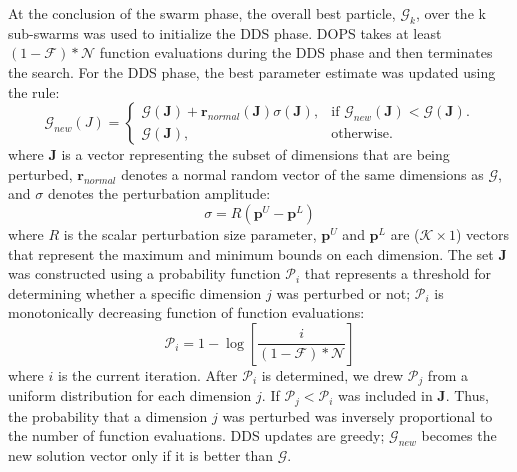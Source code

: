 \documentclass{bmcart}
\begin{document}
At the conclusion of the swarm phase, the overall best particle, $\mathcal{G}_{k}$, over the k sub-swarms was used to initialize the DDS phase.
DOPS takes at least $\left(1-\mathcal{F}\right)*\mathcal{N}$ function evaluations during the DDS phase and then terminates the search.
For the DDS phase, the best parameter estimate was updated using the rule:
\begin{equation}
  \mathcal{G}_{new}({J})=\begin{cases}
    \mathcal{G}(\mathbf{J})+\mathbf{r}_{normal}(\mathbf{J})\sigma(\mathbf{J}), & \text{if $\mathcal{G}_{new}(\mathbf{J})<\mathcal{G}(\mathbf{J})$}.\\
    \mathcal{G}(\mathbf{J}), & \text{otherwise}.
  \end{cases}
\end{equation}
where $\mathbf{J}$ is a vector representing the subset of dimensions that are being perturbed, $\mathbf{r}_{normal}$ denotes a normal random vector of the same dimensions as $\mathcal{G}$,
and $\sigma$ denotes the perturbation amplitude:
\begin{equation}
	\sigma = {R}(\mathbf{p}^U - \mathbf{p}^L)
\end{equation}
where ${R}$ is the scalar perturbation size parameter, $\mathbf{p}^U$ and $\mathbf{p}^L$ are ($\mathcal{K}\times{1}$) vectors that represent the maximum and minimum bounds on each dimension. The set $\mathbf{J}$ was constructed using a probability function $\mathcal{P}_{i}$ that represents a threshold for determining whether a specific dimension $j$ was perturbed or not; $\mathcal{P}_{i}$ is monotonically decreasing function of function evaluations:
\begin{equation}
	\mathcal{P}_{i}={1}-\log\left[\frac{i}{(1-\mathcal{F})*\mathcal{N}}\right]
\end{equation}
where $i$ is the current iteration. After $\mathcal{P}_{i}$ is determined, we drew $\mathcal{P}_{j}$ from a uniform distribution for each dimension $j$.
If $\mathcal{P}_{j}<\mathcal{P}_{i}$ was included in \textbf{J}.
Thus, the probability that a dimension $j$ was perturbed was inversely proportional to the number of function evaluations.
DDS updates are greedy; $\mathcal{G}_{new}$ becomes the new solution vector only if it is better than $\mathcal{G}$.
\end{document}
